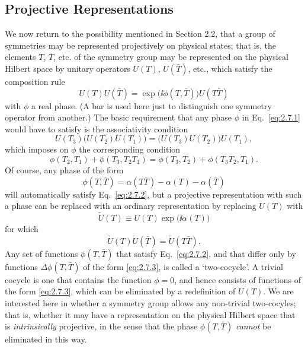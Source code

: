
\subsection[Projective Representations]{Projective Representations\texorpdfstring{\protect\footnotemark}{}}

We now return to the possibility mentioned in Section 2.2, that a group of
symmetries may be represented projectively on physical states; that is, the
elements $T$, $\bar T$, etc. of the symmetry group may be represented on the
physical Hilbert space by unitary operators $U(T)$, $U(\bar T)$, etc., which
satisfy the composition rule
\begin{equation}
  U(T)U(\bar T)=\exp\bigl(\ii\phi(T,\bar T)\bigr)U(T\bar T)
  \tag{2.7.1}\label{eq:2.7.1}
\end{equation}
with $\phi$ a real phase. (A bar is used here just to distinguish one symmetry
operator from another.) The basic requirement that any phase $\phi$ in
Eq.~\eqref{eq:2.7.1} would have to satisfy is the associativity condition
\begin{equation*}
  U(T_3)\bigl(U(T_2)U(T_1)\bigr)
    =\bigl(U(T_3)U(T_2)\bigr)U(T_1),
\end{equation*}
which imposes on $\phi$ the corresponding condition
\begin{equation}
  \phi(T_2,T_1)+\phi(T_3,T_2T_1)
    =\phi(T_3,T_2)+\phi(T_3T_2,T_1).
  \tag{2.7.2}\label{eq:2.7.2}
\end{equation}
Of course, any phase of the form
\begin{equation}
  \phi(T,\bar T)=\alpha(T\bar T)-\alpha(T)-\alpha(\bar T)
  \tag{2.7.3}\label{eq:2.7.3}
\end{equation}
will automatically satisfy Eq.~\eqref{eq:2.7.2}, but a projective representation with
such a phase can be replaced with an ordinary representation by replacing
$U(T)$ with
\begin{equation*}
  \widetilde U(T)\equiv U(T)\exp\bigl(\ii\alpha(T)\bigr)
\end{equation*}
for which
\begin{equation*}
  \widetilde U(T)\widetilde U(\bar T)=\widetilde U(T\bar T).
\end{equation*}
Any set of functions $\phi(T,\bar T)$ that satisfy Eq.~\eqref{eq:2.7.2}, and that differ
only by functions $\Delta\phi(T,\bar T)$ of the form \eqref{eq:2.7.3}, is called a
`two-cocycle'. A trivial cocycle is one that contains the function $\phi=0$,
and hence consists of functions of the form \eqref{eq:2.7.3}, which can be eliminated by
a redefinition of $U(T)$. We are interested here in whether a symmetry group
allows any non-trivial two-cocyles; that is, whether it may have a
representation on the physical Hilbert space that is \emph{intrinsically}
projective, in the sense that the phase $\phi(T,\bar T)$ \emph{cannot} be
eliminated in this way.

